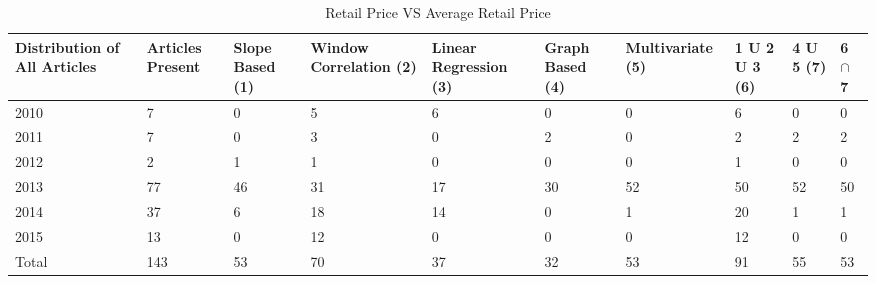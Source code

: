 \documentclass[a4paper,10pt]{report}
\begin{document}
	\begin{table}[]
	\centering
	\resizebox{\textwidth}{!}
	{\begin{tabular}{|l|l|l|l|l|l|l|l|l|l|}
	\hline
	Distribution of All Articles & Articles Present & Slope Based (1) & Window Correlation (2) & Linear Regression (3) & Graph Based (4) & Multivariate (5) & 1 U 2 U 3 (6) & 4 U 5 (7) & 6  $\cap$ 7 \\
	\hline
	2010                         & 7                & 0           & 5           & 6                 & 0           & 0             & 6         & 0     & 0                                     \\
	\hline
	2011                         & 7                & 0           & 3           & 0                 & 2           & 0             & 2         & 2     & 2                                     \\
	\hline
	2012                         & 2                & 1           & 1           & 0                 & 0           & 0             & 1         & 0     & 0                                     \\
	\hline
	2013                         & 77               & 46          & 31          & 17                & 30          & 52            & 50        & 52    & 50                                    \\
	\hline
	2014                         & 37               & 6           & 18          & 14                & 0           & 1             & 20        & 1     & 1                                     \\
	\hline
	2015                         & 13               & 0           & 12          & 0                 & 0           & 0             & 12        & 0     & 0                                     \\
	\hline
	Total                        & 143              & 53          & 70          & 37                & 32          & 53            & 91        & 55    & 53                                   \\
	\hline
	\end{tabular}}	
	\caption{Retail Price VS Average Retail Price}
	\label{RetailVsAverage}
	\end{table}
	
	
	
\end{document}
